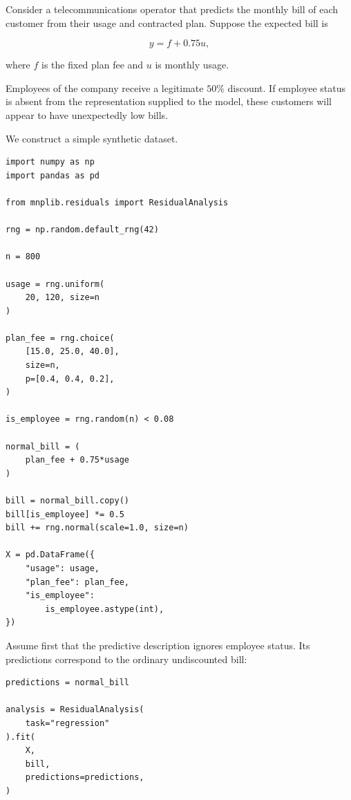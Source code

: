 \begin{example}
\label{ex:employee_discount_anomaly}

Consider a telecommunications operator that predicts the monthly bill of each
customer from their usage and contracted plan. Suppose the expected bill is

\[
y = f + 0.75u,
\]

where \(f\) is the fixed plan fee and \(u\) is monthly usage.

Employees of the company receive a legitimate \(50\%\) discount. If employee
status is absent from the representation supplied to the model, these customers
will appear to have unexpectedly low bills.

We construct a simple synthetic dataset.

\begin{sourcecode}
{\scriptsize
\begin{verbatim}
import numpy as np
import pandas as pd

from mnplib.residuals import ResidualAnalysis

rng = np.random.default_rng(42)

n = 800

usage = rng.uniform(
    20, 120, size=n
)

plan_fee = rng.choice(
    [15.0, 25.0, 40.0],
    size=n,
    p=[0.4, 0.4, 0.2],
)

is_employee = rng.random(n) < 0.08

normal_bill = (
    plan_fee + 0.75*usage
)

bill = normal_bill.copy()
bill[is_employee] *= 0.5
bill += rng.normal(scale=1.0, size=n)

X = pd.DataFrame({
    "usage": usage,
    "plan_fee": plan_fee,
    "is_employee":
        is_employee.astype(int),
})
\end{verbatim}}
\end{sourcecode}

Assume first that the predictive description ignores employee status. Its
predictions correspond to the ordinary undiscounted bill:

\begin{sourcecode}
{\scriptsize
\begin{verbatim}
predictions = normal_bill

analysis = ResidualAnalysis(
    task="regression"
).fit(
    X,
    bill,
    predictions=predictions,
)
\end{verbatim}}
\end{sourcecode}


\end{example}
